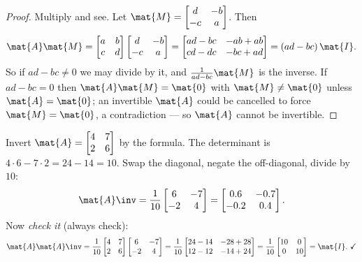 \begin{proof}
Multiply and see. Let $\mat{M} = \begin{bmatrix} d & -b \\ -c & a \end{bmatrix}$. Then
\[
\mat{A}\mat{M} = \begin{bmatrix} a & b \\ c & d \end{bmatrix}
\begin{bmatrix} d & -b \\ -c & a \end{bmatrix}
= \begin{bmatrix} ad - bc & -ab + ab \\ cd - dc & -bc + ad \end{bmatrix}
= (ad-bc)\,\mat{I}.
\]
So if $ad-bc \ne 0$ we may divide by it, and $\frac{1}{ad-bc}\mat{M}$ is the inverse.
If $ad - bc = 0$ then $\mat{A}\mat{M} = \mat{0}$ with $\mat{M}\ne\mat{0}$ unless
$\mat{A}=\mat{0}$; an invertible $\mat{A}$ could be cancelled to force $\mat{M}=\mat{0}$,
a contradiction --- so $\mat{A}$ cannot be invertible.
\end{proof}

\begin{labbox}
Invert $\mat{A} = \begin{bmatrix} 4 & 7 \\ 2 & 6 \end{bmatrix}$ by the formula. The
determinant is $4\cdot6 - 7\cdot2 = 24 - 14 = 10$. Swap the diagonal, negate the
off-diagonal, divide by $10$:
\[
\mat{A}\inv = \frac{1}{10}\begin{bmatrix} 6 & -7 \\ -2 & 4 \end{bmatrix}
= \begin{bmatrix} 0.6 & -0.7 \\ -0.2 & 0.4 \end{bmatrix}.
\]
Now \emph{check it} (always check):
\[
\mat{A}\mat{A}\inv = \frac{1}{10}\begin{bmatrix} 4 & 7 \\ 2 & 6 \end{bmatrix}
\begin{bmatrix} 6 & -7 \\ -2 & 4 \end{bmatrix}
= \frac{1}{10}\begin{bmatrix} 24-14 & -28+28 \\ 12-12 & -14+24 \end{bmatrix}
= \frac{1}{10}\begin{bmatrix} 10 & 0 \\ 0 & 10 \end{bmatrix} = \mat{I}.\ \checkmark
\]
\end{labbox}

